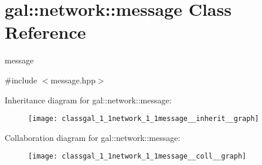 \hypertarget{classgal_1_1network_1_1message}{\section{gal\-:\-:network\-:\-:message \-Class \-Reference}
\label{classgal_1_1network_1_1message}
}


message  




{\ttfamily \#include $<$message.\-hpp$>$}



\-Inheritance diagram for gal\-:\-:network\-:\-:message\-:\nopagebreak
\begin{figure}[H]
\begin{center}
\leavevmode
\texttt{[image: classgal\_1\_1network\_1\_1message\_\_inherit\_\_graph]}
\end{center}
\end{figure}


\-Collaboration diagram for gal\-:\-:network\-:\-:message\-:\nopagebreak
\begin{figure}[H]
\begin{center}
\leavevmode
\texttt{[image: classgal\_1\_1network\_1\_1message\_\_coll\_\_graph]}
\end{center}
\end{figure}
